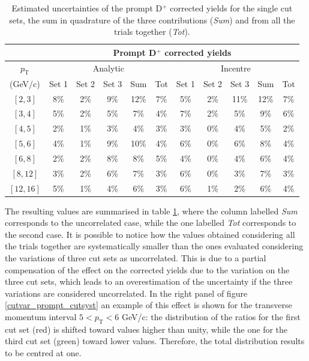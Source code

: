 \documentclass[b5paper,10pt,twoside,oldstyle,classica]{toptesi}
\newcommand{\pt}{p_\text{T}}
\begin{document}
\begin{table}[tb]
\centering 
\begin{center} %
\renewcommand\arraystretch{1.2} 
\fontsize{9}{11}\selectfont
\begin{tabular}{|c|c|c|c|c|c|c|c|c|c|c|}
\cline{2-11}
\multicolumn{1}{c|}{} & \multicolumn{10}{c|}{Prompt D$^+$ corrected yields}\\
\hline
$\pt$ & \multicolumn{5}{c|}{Analytic} & \multicolumn{5}{c|}{Incentre} \\
\cline{2-11}
(GeV/c) & Set 1 & Set 2 & Set 3 & Sum & Tot & Set 1 & Set 2 & Set 3 & Sum & Tot\\
\hline
$[2,3]$ & 8\% & 2\% & 9\% & 12\% & 7\% & 5\% & 2\% & 11\% & 12\% & 7\%\\
$[3,4]$ & 5\% & 2\% & 5\% & 7\% & 4\% & 7\% & 2\% & 5\% & 9\% & 6\%\\
$[4,5]$ & 2\% & 1\% & 3\% & 4\% & 3\% & 3\% & 0\% & 4\% & 5\% & 2\%\\
$[5,6]$ & 4\% & 1\% & 9\% & 10\% & 4\% & 6\% & 0\% & 6\% & 8\% & 4\%\\
$[6,8]$ & 2\% & 2\% & 8\% & 8\% & 5\% & 4\% & 0\% & 4\% & 6\% & 4\%\\
$[8,12]$ & 3\% & 2\% & 6\% & 7\% & 3\% & 6\% & 0\% & 3\% & 7\% & 3\%\\
$[12,16]$ & 5\% & 1\% & 4\% & 6\% & 3\% & 6\% & 1\% & 2\% & 6\% & 4\%\\
\hline
\end{tabular}
\caption{Estimated uncertainties of the prompt D$^+$ corrected yields for the single cut sets, the sum in quadrature of the three contributions (\textit{Sum}) and from all the trials together (\textit{Tot}).}
\label{prompt_cutsyst_tab}
\end{center} 
\end{table} The resulting values are summarised in table \ref{prompt_cutsyst_tab}, where the column labelled \textit{Sum} corresponds to the uncorrelated case, while the one labelled \textit{Tot} corresponds to the second case. It is possible to notice how the values obtained considering all the trials together are systematically smaller than the ones evaluated considering the variations of three cut sets as uncorrelated. This is due to a partial compensation of the effect on the corrected yields due to the variation on the three cut sets, which leads to an overestimation of the uncertainty if the three variations are considered uncorrelated. In the right panel of figure \ref{cutvar_prompt_cutsyst} an example of this effect is shown for the transverse momentum interval $5<\pt<6$ GeV/c: the distribution of the ratios for the first cut set (red) is shifted toward values higher than unity, while the one for the third cut set (green) toward lower values. Therefore, the total distribution results to be centred at one. \begin{table}[tb]

\end{table}
\end{document}
